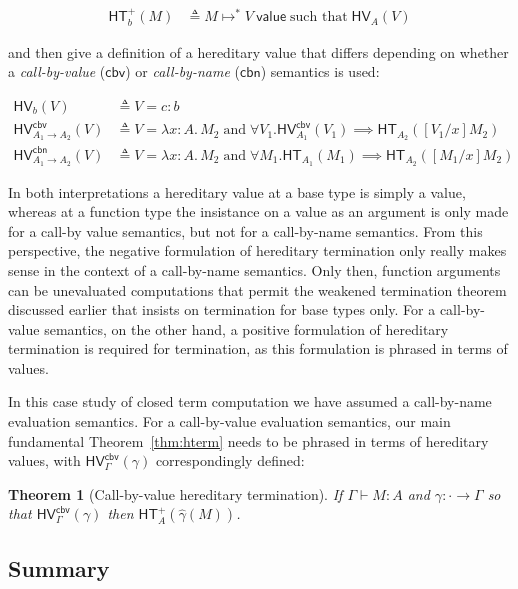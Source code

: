 \documentclass{article}
\newtheorem{thm}{Theorem}
\newcommand{\hasEF}[3]{\ensuremath{#1 \vdash #2 : #3}}
\newcommand{\hterm}[2]{\ensuremath{\mathsf{HT}_{#1}(#2)}}
\newcommand{\htermp}[2]{\ensuremath{\mathsf{HT}^+_{#1}(#2)}}
\newcommand{\hv}[2]{\ensuremath{\mathsf{HV}_{#1}(#2)}}
\newcommand{\hvcbn}[2]{\ensuremath{\mathsf{HV}^{\mathsf{cbn}}_{#1}(#2)}}
\newcommand{\hvcbv}[2]{\ensuremath{\mathsf{HV}^{\mathsf{cbv}}_{#1}(#2)}}
\newcommand{\steps}[2]{\ensuremath{#1 \mapsto^* #2}}
\newcommand{\valueJ}[1]{\ensuremath{#1\ \mathsf{value}}}
\newcommand{\fn}[2]{\ensuremath{#1 \to #2}}
\newcommand{\lam}[3]{\ensuremath{\lambda #1 {:} #2.\, #3}}
\begin{document}
\begin{align*}
  \htermp{b}{M} &\triangleq \steps{M}{\valueJ{V}} \;\text{such that}\; \hv{A}{V}
\end{align*}

\noindent and then give a definition of a hereditary value that differs depending on whether a \emph{call-by-value}
($\mathsf{cbv}$) or \emph{call-by-name} ($\mathsf{cbn}$) semantics is used:

\begin{align*}
\hv{b}{V} &\triangleq V = c : b \\
\hvcbv{\fn{A_1}{A_2}}{V} &\triangleq V = \lam{x}{A}{M_2} \; \text{and} \; \forall V_1. \hvcbv{A_1}{V_1} \implies
\hterm{A_2}{[V_1/x]M_2} \\
\hvcbn{\fn{A_1}{A_2}}{V} &\triangleq V = \lam{x}{A}{M_2} \; \text{and} \; \forall M_1. \hterm{A_1}{M_1} \implies
\hterm{A_2}{[M_1/x]M_2}
\end{align*}

In both interpretations a hereditary value at a base type is simply a value, whereas at a
function type the insistance on a value as an argument is only made for a call-by value
semantics, but not for a call-by-name semantics.  From this perspective, the negative
formulation of hereditary termination only really makes sense in the context of a call-by-name
semantics.  Only then, function arguments can be unevaluated computations that permit the weakened
termination theorem discussed earlier that insists on termination for base types only.  For a
call-by-value semantics, on the other hand, a positive formulation of hereditary termination is
required for termination, as this formulation is phrased in terms of values.

In this case study of closed term computation we have assumed a call-by-name evaluation
semantics.  For a call-by-value evaluation semantics, our main fundamental
Theorem~\ref{thm:hterm} needs to be phrased in terms of hereditary values, with
$\hvcbv{\Gamma}{\gamma}$ correspondingly defined:

\begin{thm}[Call-by-value hereditary termination]\label{thm:hcbvterm}
  If $\hasEF{\Gamma}{M}{A}$ and $\gamma : \cdot \to \Gamma$ so that
  $\hvcbv{\Gamma}{\gamma}$ then $\htermp{A}{\hat{\gamma}(M)}$.
\end{thm}

\subsection{Summary}
\end{document}
